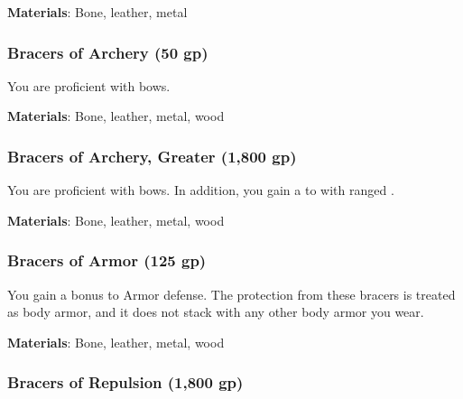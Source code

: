 \vspace{0.25em}
\textbf{Materials}: Bone, leather, metal


\lowercase{\hypertarget{item:Bracers of Archery}{}}\label{item:Bracers of Archery}
\hypertarget{item:Bracers of Archery}{\subsubsection{Bracers of Archery\hfill{} (50 gp)}}

You are proficient with bows.



\vspace{0.25em}
\textbf{Materials}: Bone, leather, metal, wood


\lowercase{\hypertarget{item:Bracers of Archery, Greater}{}}\label{item:Bracers of Archery, Greater}
\hypertarget{item:Bracers of Archery, Greater}{\subsubsection{Bracers of Archery, Greater\hfill{} (1,800 gp)}}

You are proficient with bows.
In addition, you gain a   to  with ranged .



\vspace{0.25em}
\textbf{Materials}: Bone, leather, metal, wood


\lowercase{\hypertarget{item:Bracers of Armor}{}}\label{item:Bracers of Armor}
\hypertarget{item:Bracers of Armor}{\subsubsection{Bracers of Armor\hfill{} (125 gp)}}

You gain a  bonus to Armor defense.
The protection from these bracers is treated as body armor, and it does not stack with any other body armor you wear.



\vspace{0.25em}
\textbf{Materials}: Bone, leather, metal, wood


\lowercase{\hypertarget{item:Bracers of Repulsion}{}}\label{item:Bracers of Repulsion}
\hypertarget{item:Bracers of Repulsion}{\subsubsection{Bracers of Repulsion\hfill{} (1,800 gp)}}

